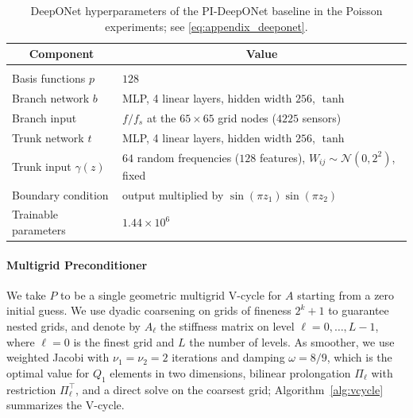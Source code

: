 \documentclass{article} %
\begin{document}
\begin{table}[htb]
   \caption{DeepONet hyperparameters of the PI-DeepONet baseline in the Poisson experiments; see \eqref{eq:appendix_deeponet}.}
   \label{tab:deeponet}
   \begin{center}
   \begin{tabular}{ll}
      \multicolumn{1}{c}{\bf Component} & \multicolumn{1}{c}{\bf Value} \\ \hline \\
      Basis functions $p$        & $128$ \\
      Branch network $b$         & MLP, 4 linear layers, hidden width $256$, $\tanh$ \\
      Branch input               & $f/f_s$ at the $65\times65$ grid nodes ($4225$ sensors) \\
      Trunk network $t$          & MLP, 4 linear layers, hidden width $256$, $\tanh$ \\
      Trunk input $\gamma(z)$    & $64$ random frequencies ($128$ features), $W_{ij}\sim\mathcal N(0, 2^2)$, fixed \\
      Boundary condition         & output multiplied by $\sin(\pi z_1)\sin(\pi z_2)$ \\
      Trainable parameters       & $1.44\times10^{6}$ \\
   \end{tabular}
   \end{center}
\end{table}

\paragraph{Multigrid Preconditioner} We take $P$ to be a single geometric multigrid V-cycle for $A$ starting from a zero initial guess. We use dyadic coarsening on grids of fineness $2^k+1$ to guarantee nested grids, and denote by $A_\ell$ the stiffness matrix on level $\ell=0,\dots,L-1$, where $\ell=0$ is the finest grid and $L$ the number of levels. As smoother, we use weighted Jacobi with $\nu_1=\nu_2=2$ iterations and damping $\omega=8/9$, which is the optimal value for $Q_1$ elements in two dimensions, bilinear prolongation $\Pi_\ell$ with restriction $\Pi_\ell^\top$, and a direct solve on the coarsest grid; Algorithm~\ref{alg:vcycle} summarizes the V-cycle.
\end{document}
